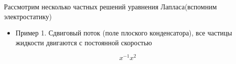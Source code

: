 Рассмотрим несколько частных решений уравнения Лапласа(вспомним электростатику)
\begin{itemize}
	\item Пример 1.
	Сдвиговый поток (поле плоского конденсатора), все частицы жидкости двигаются с постоянной скоростью

\end{itemize}

\begin{equation}
    x^{-1}
    x^2

\end{equation}
